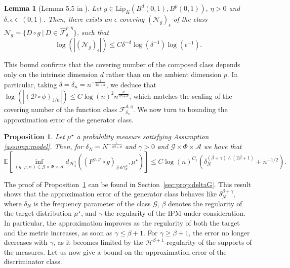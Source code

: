 \documentclass[10pt]{article}
\newtheorem{proposition}{Proposition}
\newtheorem{lemma}{Lemma}
\begin{document}
\begin{lemma}[Lemma 5.5 in \cite{stephanovitch2023wasserstein}]\label{lemma:coveringd}
    Let $g\in \text{Lip}_K(B^d(0,1),B^p(0,1))$, $\eta>0$ and $\delta,\epsilon\in (0,1)$. Then, there exists an $\epsilon$-covering $(\mathcal{N}_g)_\epsilon$ of the class $\mathcal{N}_g=\{D\circ g\ |\ D\in \hat{\mathcal{F}}^{p,\eta}_\delta\}$, such that 
    $$\log(|(\mathcal{N}_g)_\epsilon|)\leq C\delta^{-d}\log(\delta^{-1})\log(\epsilon^{-1}).$$
\end{lemma}
This bound confirms that the covering number of the composed class depends only on the intrinsic dimension $d$ rather than on the ambient dimension
$p$. In particular, taking $\delta = \delta_n = n^{-\frac{1}{2\beta+d}}$, we deduce that $\log( |(\mathcal{D}\circ \phi)_{1/n}|)\leq C \log(n)^2 n^{\frac{d}{2\beta+d}}$, which matches the scaling of the covering number of the function class $\mathcal{F}^{d,\eta}_{\delta_n}$. We now turn to bounding the approximation error of the generator class.


\begin{proposition}\label{prop:deltaG}  Let $\mu^\star$ a probability measure satisfying Assumption \ref{assump:model}. Then, for $\delta_N=N^{-\frac{1}{2\beta+d}}$ and $\gamma>0$ and $\mathcal{G}\times \Phi \times \mathcal{A}$ we have that
    $$\mathbb{E}\left[\inf_{(g,\varphi,\alpha)\in \mathcal{G}\times  \Phi\times \mathcal{A}} d_{\mathcal{H}_1^{\gamma}}((F^{g,\varphi}\circ g)_{\# \alpha \gamma_d^n},\mu^\star)\right]\leq  C\log(n)^{C_2}(\delta_N^{(\beta + \gamma)\wedge (2\beta+1)}+n^{-1/2}).$$
\end{proposition}

The proof of Proposition~\ref{prop:deltaG} can be found in Section~\ref{sec:prop:deltaG}. This result shows that the  approximation error of the generator class behaves like \( \delta_N^{\beta + \gamma} \), where \( \delta_N \) is the frequency parameter of the class \( \mathcal{G} \), \( \beta \) denotes the regularity of the target distribution \( \mu^\star \), and \( \gamma \) the regularity of the IPM under consideration. In particular, the approximation improves as the regularity of both the target and the metric increases, as soon as \( \gamma \leq \beta+1 \). For \( \gamma \geq \beta + 1 \), the error no longer decreases with \( \gamma \), as it becomes limited by the $\mathcal{H}^{\beta+1}$-regularity of the supports of the measures. Let us now give a bound on the approximation error of the discriminator class.
\end{document}
